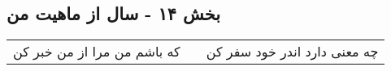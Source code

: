 \begin{center}
\section*{بخش ۱۴ - سال از ماهیت من}
\label{sec:sh014}
\begin{longtable}{l p{0.5cm} r}
که باشم من مرا از من خبر کن
&&
چه معنی دارد اندر خود سفر کن
\\
\end{longtable}
\end{center}
